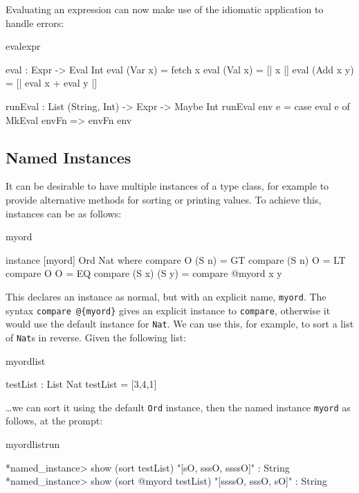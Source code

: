 
\noindent
Evaluating an expression can now make use of the idiomatic application to handle
errors:

\begin{SaveVerbatim}{evalexpr}

eval : Expr -> Eval Int
eval (Var x)   = fetch x
eval (Val x)   = [| x |]
eval (Add x y) = [| eval x + eval y |]
  
runEval : List (String, Int) -> Expr -> Maybe Int
runEval env e = case eval e of
    MkEval envFn => envFn env

\end{SaveVerbatim}

\subsection{Named Instances}

It can be desirable to have multiple instances of a type class, for example to provide
alternative methods for sorting or printing values. To achieve this, instances can
be  as follows:

\begin{SaveVerbatim}{myord}

instance [myord] Ord Nat where
   compare O (S n)     = GT
   compare (S n) O     = LT
   compare O O         = EQ
   compare (S x) (S y) = compare @{myord} x y

\end{SaveVerbatim}

\noindent
This declares an instance as normal, but with an explicit name, \texttt{myord}.
The syntax \texttt{compare @\{myord\}} gives an explicit instance to 
\texttt{compare}, otherwise it would use the default instance for \texttt{Nat}.
We can use this, for example, to sort a list of \texttt{Nat}s in reverse.
Given the following list:

\begin{SaveVerbatim}{myordlist}

testList : List Nat
testList = [3,4,1]

\end{SaveVerbatim}

\noindent
\ldots we can sort it using the default \texttt{Ord} instance, then the named
instance \texttt{myord} as follows, at the \Idris{} prompt:

\begin{SaveVerbatim}{myordlistrun}

*named_instance> show (sort testList)
"[sO, sssO, ssssO]" : String
*named_instance> show (sort @{myord} testList)
"[ssssO, sssO, sO]" : String

\end{SaveVerbatim}

